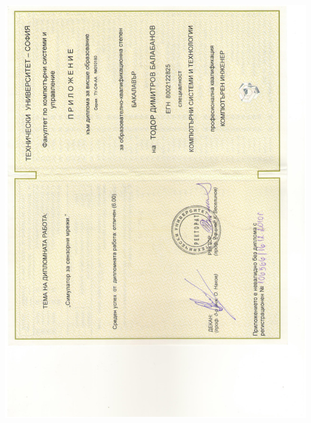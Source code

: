 \documentclass[bulgarian,a4paper]{europasscv}
\begin{document}
\includegraphics[width=\textwidth,height=\textheight,keepaspectratio]{DiplomaTU2010_3}
\end{document}
